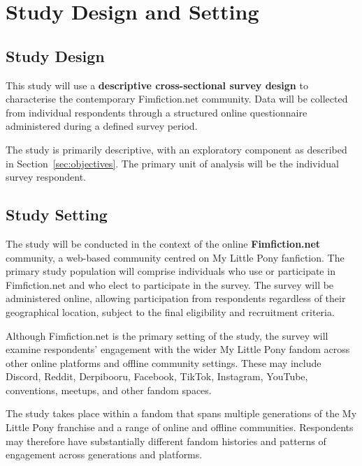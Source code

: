 \section{Study Design and Setting}

\subsection{Study Design}

This study will use a \textbf{descriptive cross-sectional survey design} to characterise the contemporary Fimfiction.net community. Data will be collected from individual respondents through a structured online questionnaire administered during a defined survey period.

The study is primarily descriptive, with an exploratory component as described in Section~\ref{sec:objectives}. The primary unit of analysis will be the individual survey respondent.

\subsection{Study Setting}

The study will be conducted in the context of the online \textbf{Fimfiction.net} community, a web-based community centred on My Little Pony fanfiction. The primary study population will comprise individuals who use or participate in Fimfiction.net and who elect to participate in the survey. The survey will be administered online, allowing participation from respondents regardless of their geographical location, subject to the final eligibility and recruitment criteria.

Although Fimfiction.net is the primary setting of the study, the survey will examine respondents' engagement with the wider My Little Pony fandom across other online platforms and offline community settings. These may include Discord, Reddit, Derpibooru, Facebook, TikTok, Instagram, YouTube, conventions, meetups, and other fandom spaces.

The study takes place within a fandom that spans multiple generations of the My Little Pony franchise and a range of online and offline communities. Respondents may therefore have substantially different fandom histories and patterns of engagement across generations and platforms.

